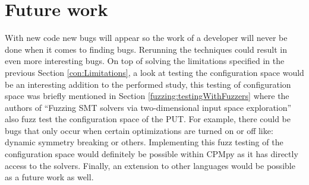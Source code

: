 


\section{Future work}
\label{con:FutureWork}
With new code new bugs will appear so the work of a developer will never be done when it comes to finding bugs. Rerunning the techniques could result in even more interesting bugs. 
On top of solving the limitations specified in the previous Section \ref{con:Limitations},
a look at testing the configuration space would be an interesting addition to the performed study, this testing of configuration space was briefly mentioned in Section \ref{fuzzing:testingWithFuzzers} where the authors of “Fuzzing SMT solvers via two-dimensional input space exploration” \cite{42FalconFuzzingConfigurationSettingsAndNormal} also fuzz test the configuration space of the PUT. For example, there could be bugs that only occur when certain optimizations are turned on or off like: dynamic symmetry breaking or others. Implementing this fuzz testing of the configuration space would definitely be possible within CPMpy as it has directly access to the solvers.
Finally, an extension to other languages would be possible as a future work as well.


